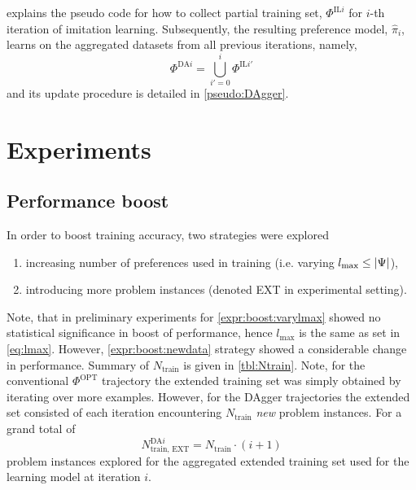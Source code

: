 
 explains the pseudo code for how to collect 
partial training set, $\Phi^{\text{IL}i}$ for $i$-th iteration of imitation 
learning.
Subsequently, the resulting preference model, $\hat{\pi}_i$, learns on the 
aggregated datasets from all previous iterations, namely,  
\begin{equation}\label{eq:DAgger}
\Phi^{\text{DA}i}=\bigcup_{i'=0}^{i}\Phi^{\text{IL}i'}
\end{equation}
and its update procedure is detailed in \cref{pseudo:DAgger}.




\section{Experiments}\label{sec:expr}

\subsection*{Performance boost}

In order to boost training accuracy, two strategies were explored 
\begin{enumerate}[after={{}}, leftmargin=*,
    label={\textbf{Boost.\arabic*}}, ref={{Boost.\arabic*}}]
    \item \label{expr:boost:varylmax} increasing number of preferences used 
    in training (i.e. varying \mbox{$l_{\max} \leq \lvert\Psi\rvert$}),
    \item \label{expr:boost:newdata} introducing more problem instances 
    (denoted 
    EXT in experimental setting).
\end{enumerate}
Note, that in preliminary experiments for \ref{expr:boost:varylmax} showed no 
statistical significance in boost of performance, hence $l_{\max}$ is the same 
as set in \cref{eq:lmax}.
However, \ref{expr:boost:newdata} strategy showed a considerable change in 
performance. Summary of $N_{\text{train}}$ is given in \cref{tbl:Ntrain}. 
Note, for the conventional $\Phi^{\text{OPT}}$ trajectory the extended training 
set was simply obtained by iterating over more examples. 
However, for the DAgger trajectories the extended set consisted of each 
iteration encountering $N_{\text{train}}$ \emph{new} problem 
instances. For a grand total of 
\begin{equation}
N^{\text{DA}i}_{\text{train, EXT}}=N_{\text{train}}\cdot (i+1) 
\end{equation}
problem instances explored for the aggregated extended training set used for 
the learning model at iteration $i$.

